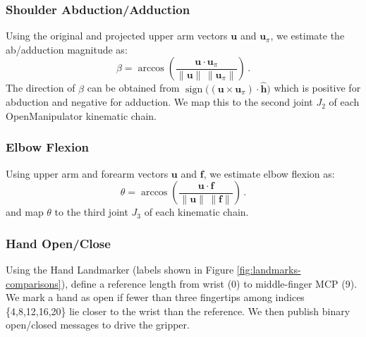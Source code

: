 \documentclass[acmsmall, screen]{acmart}
\begin{document}
\subsubsection{Shoulder Abduction/Adduction}
Using the original and projected upper arm vectors $\mathbf{u}$ and $\mathbf{u}_\pi$, we estimate the ab/adduction magnitude as:
\begin{equation}
\beta=\arccos \!\left( \frac{\mathbf{u}\cdot\mathbf{u}_\pi}{\lVert\mathbf{u}\rVert\, \lVert\mathbf{u}_\pi\rVert} \right)\,.
\end{equation}
The direction of $\beta$ can be obtained from $\operatorname{sign}\big((\mathbf{u}\times\mathbf{u}_\pi)\cdot\hat{\mathbf{h}}\big)$ which is positive for abduction and negative for adduction. We map this to the second joint $J_2$ of each OpenManipulator kinematic chain.

\subsubsection{Elbow Flexion}
Using upper arm and forearm vectors $\mathbf{u}$ and $\mathbf{f}$, we estimate elbow flexion as:
\begin{equation}
\theta=\arccos \!\left( \frac{\mathbf{u}\cdot\mathbf{f}}{\lVert\mathbf{u}\rVert\, \lVert\mathbf{f}\rVert} \right)\,.
\end{equation}
and map $\theta$ to the third joint $J_3$ of each kinematic chain.

\subsubsection{Hand Open/Close}
Using the Hand Landmarker (labels shown in Figure \ref{fig:landmarks-comparisons}), define a reference length from wrist (0) to middle-finger MCP (9). We mark a hand as open if fewer than three fingertips among indices \{4,8,12,16,20\} lie closer to the wrist than the reference. We then publish binary open/closed messages to drive the gripper.
\end{document}
